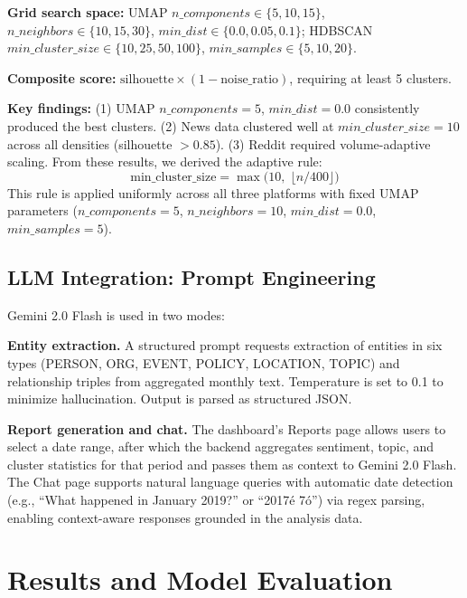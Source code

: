 \documentclass[12pt, letterpaper]{article}
\begin{document}
\textbf{Grid search space:} UMAP $n\_components \in \{5, 10, 15\}$, $n\_neighbors \in \{10, 15, 30\}$, $min\_dist \in \{0.0, 0.05, 0.1\}$; HDBSCAN $min\_cluster\_size \in \{10, 25, 50, 100\}$, $min\_samples \in \{5, 10, 20\}$.

\textbf{Composite score:} $\text{silhouette} \times (1 - \text{noise\_ratio})$, requiring at least 5 clusters.

\textbf{Key findings:} (1) UMAP $n\_components=5$, $min\_dist=0.0$ consistently produced the best clusters. (2) News data clustered well at $min\_cluster\_size=10$ across all densities (silhouette $> 0.85$). (3) Reddit required volume-adaptive scaling. From these results, we derived the adaptive rule:
\begin{equation}
\text{min\_cluster\_size} = \max\!\bigl(10,\; \lfloor n / 400 \rfloor\bigr)
\label{eq:adaptive}
\end{equation}
This rule is applied uniformly across all three platforms with fixed UMAP parameters ($n\_components=5$, $n\_neighbors=10$, $min\_dist=0.0$, $min\_samples=5$).

\subsection{LLM Integration: Prompt Engineering}

Gemini 2.0 Flash is used in two modes:

\textbf{Entity extraction.} A structured prompt requests extraction of entities in six types (PERSON, ORG, EVENT, POLICY, LOCATION, TOPIC) and relationship triples from aggregated monthly text. Temperature is set to 0.1 to minimize hallucination. Output is parsed as structured JSON.

\textbf{Report generation and chat.} The dashboard's Reports page allows users to select a date range, after which the backend aggregates sentiment, topic, and cluster statistics for that period and passes them as context to Gemini 2.0 Flash. The Chat page supports natural language queries with automatic date detection (e.g., ``What happened in January 2019?'' or ``2017\'{e} 7\'{o}'') via regex parsing, enabling context-aware responses grounded in the analysis data.

\section{Results and Model Evaluation}
\label{sec:results}
\end{document}
